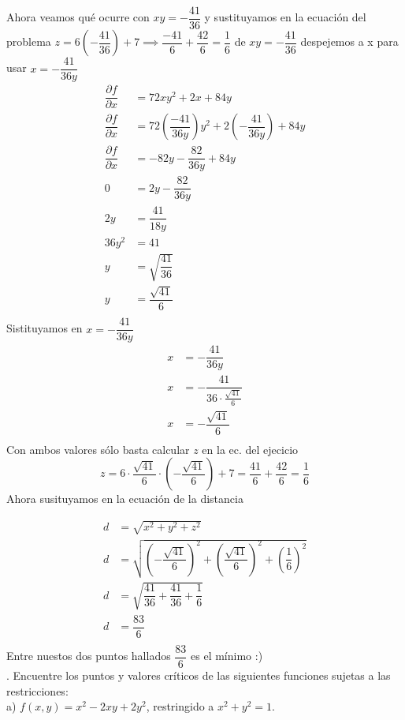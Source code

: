 \documentclass[letterpaper]{article}
\renewcommand{\d}{\partial}
\renewcommand{\*}{\cdot}
\theoremstyle{definition}
\begin{document}
Ahora veamos qué ocurre con $ xy = -\dfrac{41}{36} $ y sustituyamos en la ecuación del problema $ z = 6 (-\dfrac{41}{36}) + 7 \implies \dfrac{-41}{6} + \dfrac{42}{6} = \dfrac{1}{6} $ de $ xy = -\dfrac{41}{36} $ despejemos a x para usar $ x = -\dfrac{41}{36y} $
\begin{align*}
	\dfrac{\d f}{\d x} &= 72xy^2 + 2x + 84y\\
	\dfrac{\d f}{\d x} &= 72\left(\dfrac{-41}{36y}\right)y^2 + 2\left( -\dfrac{41}{36y} \right) + 84y\\
	\dfrac{\d f}{\d x} &= -82y - \dfrac{82}{36y}+ 84y\\
	0 &= 2y -\dfrac{82}{36y}\\
	2y &= \dfrac{41}{18y}\\
	36y^2 &= 41\\
	y &= \sqrt{\dfrac{41}{36}}\\
	y &= \dfrac{\sqrt{41}}{6}\\
\end{align*}
Sistituyamos en $ x = -\dfrac{41}{36y} $
\begin{align*}
	x &= -\dfrac{41}{36y}\\
	x &= -\dfrac{41}{36 \* \frac{\sqrt{41}}{6}} \\
	x &= -\dfrac{\sqrt{41}}{6}\\
\end{align*}
Con ambos valores sólo basta calcular $ z $ en la ec. del ejecicio
\[ z = 6 \* \dfrac{\sqrt{41}}{6} \* (- \dfrac{\sqrt{41}}{6}) + 7 = \dfrac{41}{6} + \dfrac{42}{6} = \dfrac{1}{6}  \]
Ahora susituyamos en la ecuación de la distancia

\begin{align*}
	d &= \sqrt{x^2 +y^2 + z^2}\\
	d &= \sqrt{(-\dfrac{\sqrt{41}}{6})^2 +(\dfrac{\sqrt{41}}{6})^2 + (\dfrac{1}{6})^2}\\
	d &= \sqrt{\dfrac{41}{36} + \dfrac{41}{36} + \dfrac{1}{6} }\\
	d &= \dfrac{83}{6}\\
\end{align*}
Entre nuestos dos puntos hallados $ \dfrac{83}{6} $ es el mínimo :)\\



. Encuentre los puntos y valores críticos de las siguientes funciones sujetas a las restricciones:\\


a) $f(x,y) = x^2 - 2xy + 2y^2$, restringido a $x^2 + y^2 =1$.\\
\end{document}
